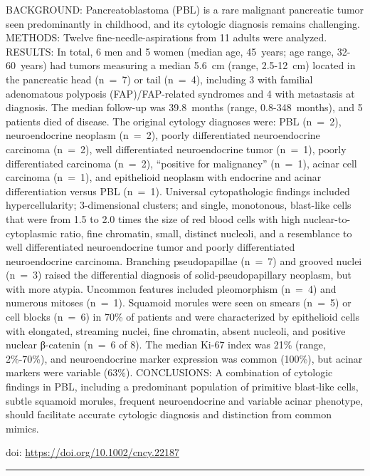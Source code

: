 \documentclass[
]{article}
\renewcommand{\linethickness}{0.05em}
\begin{document}
BACKGROUND: Pancreatoblastoma (PBL) is a rare malignant pancreatic tumor
seen predominantly in childhood, and its cytologic diagnosis remains
challenging. METHODS: Twelve fine-needle-aspirations from 11 adults were
analyzed. RESULTS: In total, 6 men and 5 women (median age, 45~years;
age range, 32-60~years) had tumors measuring a median 5.6~cm (range,
2.5-12~cm) located in the pancreatic head (n~=~7) or tail (n~=~4),
including 3 with familial adenomatous polyposis (FAP)/FAP-related
syndromes and 4 with metastasis at diagnosis. The median follow-up was
39.8~months (range, 0.8-348~months), and 5 patients died of disease. The
original cytology diagnoses were: PBL (n~=~2), neuroendocrine neoplasm
(n~=~2), poorly differentiated neuroendocrine carcinoma (n~=~2), well
differentiated neuroendocrine tumor (n~=~1), poorly differentiated
carcinoma (n~=~2), ``positive for malignancy'' (n~=~1), acinar cell
carcinoma (n~=~1), and epithelioid neoplasm with endocrine and acinar
differentiation versus PBL (n~=~1). Universal cytopathologic findings
included hypercellularity; 3-dimensional clusters; and single,
monotonous, blast-like cells that were from 1.5 to 2.0 times the size of
red blood cells with high nuclear-to-cytoplasmic ratio, fine chromatin,
small, distinct nucleoli, and a resemblance to well differentiated
neuroendocrine tumor and poorly differentiated neuroendocrine carcinoma.
Branching pseudopapillae (n~=~7) and grooved nuclei (n~=~3) raised the
differential diagnosis of solid-pseudopapillary neoplasm, but with more
atypia. Uncommon features included pleomorphism (n~=~4) and numerous
mitoses (n~=~1). Squamoid morules were seen on smears (n~=~5) or cell
blocks (n~=~6) in 70\% of patients and were characterized by epithelioid
cells with elongated, streaming nuclei, fine chromatin, absent nucleoli,
and positive nuclear β-catenin (n~=~6 of 8). The median Ki-67 index was
21\% (range, 2\%-70\%), and neuroendocrine marker expression was common
(100\%), but acinar markers were variable (63\%). CONCLUSIONS: A
combination of cytologic findings in PBL, including a predominant
population of primitive blast-like cells, subtle squamoid morules,
frequent neuroendocrine and variable acinar phenotype, should facilitate
accurate cytologic diagnosis and distinction from common mimics.

doi: \url{https://doi.org/10.1002/cncy.22187}

\begin{center}\rule{0.5\linewidth}{\linethickness}\end{center}
\end{document}
